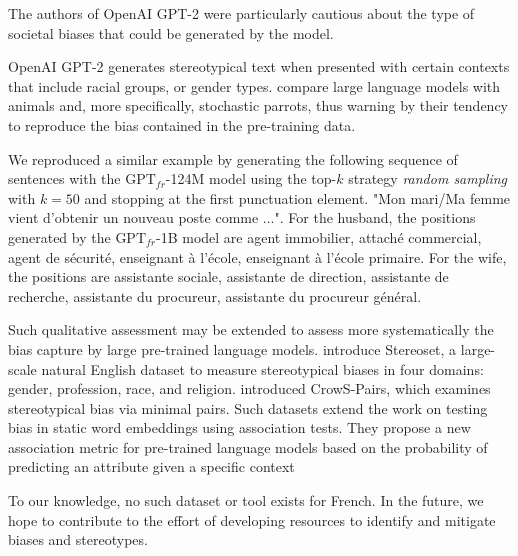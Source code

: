The authors of OpenAI GPT-2 were particularly cautious about the type of societal biases that could be generated by the model.  \textcite{sheng_19} 

OpenAI GPT-2 generates stereotypical text when presented with certain contexts that include racial groups, or gender types. \textcite{bender_21} compare large language models with animals and, more specifically, stochastic parrots, thus warning by their tendency to reproduce the bias contained in the pre-training data. 

We reproduced a similar example by generating the following sequence of sentences with the $\text{GPT}_{fr}$-124M model using the top-$k$ strategy \textit{random sampling} \parencite{lewis_18} with $k=50$ and stopping at the first punctuation element. "Mon mari/Ma femme vient d'obtenir un nouveau poste comme ...". For the husband, the positions generated by the $\text{GPT}_{fr}$-1B model are agent immobilier, attaché commercial, agent de sécurité, enseignant à l'école, enseignant à l'école primaire. For the wife, the positions are assistante sociale, assistante de direction, assistante de recherche, assistante du procureur, assistante du procureur général.

Such qualitative assessment may be extended to assess more systematically the bias capture by large pre-trained language models. \textcite{nadeem_20} introduce Stereoset, a large-scale natural English dataset to measure stereotypical biases in four domains: gender, profession, race, and religion. \textcite{nangia_20} introduced CrowS-Pairs, which examines stereotypical bias via minimal pairs. Such datasets extend the work on testing bias in static word embeddings using association tests. They propose a new association metric for pre-trained language models based on the probability of predicting an attribute given a specific context

To our knowledge, no such dataset or tool exists for French. In the future, we hope to contribute to the effort of developing resources to identify and mitigate  biases and stereotypes.


